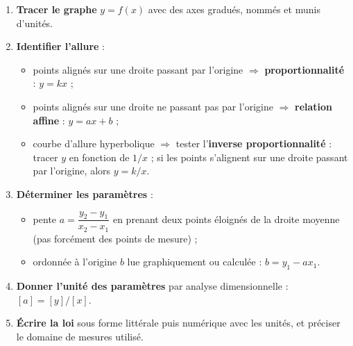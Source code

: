 \documentclass[11pt]{article}
\begin{document}
\begin{methode}
\begin{enumerate}
\item \textbf{Tracer le graphe} $y = f(x)$ avec des axes gradués, nommés et munis d'unités.
\item \textbf{Identifier l'allure} :
\begin{itemize}
\item points alignés sur une droite passant par l'origine $\Rightarrow$ \textbf{proportionnalité} : $y = kx$ ;
\item points alignés sur une droite ne passant pas par l'origine $\Rightarrow$ \textbf{relation affine} : $y = ax + b$ ;
\item courbe d'allure hyperbolique $\Rightarrow$ tester l'\textbf{inverse proportionnalité} : tracer $y$ en fonction de $1/x$ ; si les points s'alignent sur une droite passant par l'origine, alors $y = k/x$.
\end{itemize}
\item \textbf{Déterminer les paramètres} :
\begin{itemize}
\item pente $a = \dfrac{y_2 - y_1}{x_2 - x_1}$ en prenant deux points éloignés de la droite moyenne (pas forcément des points de mesure) ;
\item ordonnée à l'origine $b$ lue graphiquement ou calculée : $b = y_1 - a x_1$.
\end{itemize}
\item \textbf{Donner l'unité des paramètres} par analyse dimensionnelle : $[a] = [y]/[x]$.
\item \textbf{Écrire la loi} sous forme littérale puis numérique avec les unités, et préciser le domaine de mesures utilisé.
\end{enumerate}
\end{methode}
\end{document}
